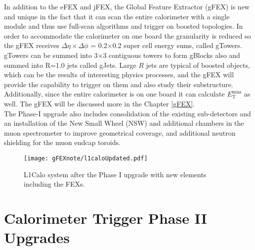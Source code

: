 In addition to the eFEX and jFEX, the Global Feature Extractor (gFEX) is new and unique in the fact that it can scan the entire calorimeter with a single module and thus use full-scan algorithms and trigger on boosted topologies.  In order to accommodate the calorimeter on one board the granularity is reduced so the gFEX receives $\Delta\eta \times \Delta\phi$ = 0.2$\times$0.2 super cell energy sums, called gTowers.  gTowers can be summed into 3$\times$3 contiguous towers to form gBlocks also and summed into R=1.0 jets called gJets.  Large $R$ jets are typical of boosted objects, which can be the results of interesting physics processes, and the gFEX will provide the capability to trigger on them and also study their substructure.  Additionally, since the entire calorimeter is on one board it can calculate $E_{\mathrm{T}}^{\mathrm{miss}}$ as well.  The gFEX will be discussed more in the Chapter \ref{gFEX}.  \\%

%

The Phase-I upgrade also includes consolidation of the existing sub-detectors and an installation of the New Small Wheel (NSW) and additional chambers in the muon spectrometer to improve geometrical coverage, and additional neutron shielding for the muon endcap toroids.  \\

\begin{figure} [h!]
\centering
\texttt{[image: gFEXnote/l1caloUpdated.pdf]} %
\caption{\label{fig:l1calo}{L1Calo system after the Phase I upgrade with new elements including the FEXs\cite{gFEXFDR}.  }}
\end{figure}

\section{Calorimeter Trigger Phase II Upgrades}

